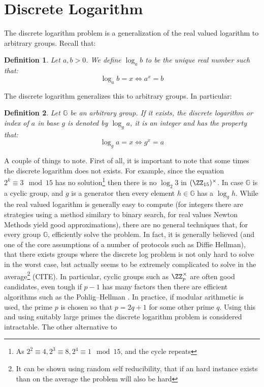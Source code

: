 \documentclass{article}
\newtheorem{definition}{Definition}
\begin{document}
\section{Discrete Logarithm}
The discrete logarithm problem is a generalization of the real valued logarithm to arbitrary groups. Recall that:
\begin{definition}
    Let $a, b > 0$. We define $\log_a b$ to be the unique real number  such that:
    \[ \log_a b = x \iff a^x = b \]
\end{definition}
The discrete logarithm generalizes this to arbitrary groups. In particular:
\begin{definition}
    Let $\mathbb{G}$ be an arbitrary group. If it exists, the discrete logarithm or index of $a$ in base $g$ is denoted
    by $\log_g a$, it is an integer and has the property that: 
    \[ \log_g a = x \iff g^x = a \]
\end{definition}
A couple of things to note. First of all, it is important to note that some times the discrete logarithm does not exists.
For example, since the equation $2^k \equiv 3 \mod 15$ has no solution\footnote{As $2^2 \equiv 4, 2^3 \equiv 8, 2^4 \equiv 1 \mod 15$, and the cycle repeats}
then there is no $\log_2 3$ in $(\ZZ_{15})^\times$. In case $\mathbb{G}$ is a cyclic group, and $g$ is a generator then 
every element $h \in \mathbb{G}$ has a $\log_g h$. While the real valued logarithm is generally easy to compute (for integers there 
are strategies using a method similary to binary search, for real values Newton Methods yield good approximations), there are no 
general techniques that, for every group $\mathbb{G}$, efficiently solve the problem. In fact, it is generally believed (and one 
of the core assumptions of a number of protocols such as Diffie Hellman), that there exists groups where the discrete log problem 
is not only hard to solve in the worst case, but actually seems to be extremely complicated to solve in the average\footnote{It can be shown
using random self reducibility, that if an hard instance exists than on the average the problem will also be hard} (CITE).
In particular, cyclic groups such as $\ZZ_p^\times$ are often good candidates, even tough if $p - 1$ has many factors 
then there are efficient algorithms such as the Pohlig–Hellman \cite{pohligImprovedAlgorithmComputing1978}. In practice, 
if modular arithmetic is used, the prime $p$ is chosen so that $p = 2q + 1$ for some other prime $q$. Using this and using
suitably large primes the discrete logarithm problem is considered intractable. The other alternative to 
\end{document}
